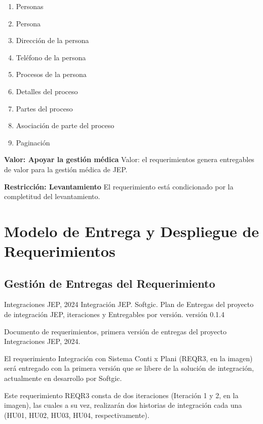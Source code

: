 \documentclass[
  paper=a4,
  ,captions=tableheading
]{scrartcl}
\providecommand{\tightlist}{%
  \setlength{\itemsep}{0pt}\setlength{\parskip}{0pt}}
\renewenvironment{quote}{\begin{customblockquote}\list{}{\rightmargin=0em\leftmargin=0em}%
\item\relax\color{blockquote-text}\ignorespaces}{\unskip\unskip\endlist\end{customblockquote}}
\begin{document}
\begin{enumerate}
\def\labelenumi{\arabic{enumi}.}
\tightlist
\item
  Personas
\item
  Persona
\item
  Dirección de la persona
\item
  Teléfono de la persona
\item
  Procesos de la persona
\item
  Detalles del proceso
\item
  Partes del proceso
\item
  Asociación de parte del proceso
\item
  Paginación
\end{enumerate}

\textbf{Valor: Apoyar la gestión médica} Valor: el requerimientos genera
entregables de valor para la gestión médica de JEP.

\textbf{Restricción: Levantamiento} El requerimiento está condicionado
por la completitud del levantamiento.

\newpage

\section{Modelo de Entrega y Despliegue de
Requerimientos}\label{sec:modelo-de-entrega-y-despliegue-de-requerimientos}

\subsection{Gestión de Entregas del
Requerimiento}\label{sec:gestiuxf3n-de-entregas-del-requerimiento}

\begin{quote}
Integraciones JEP, 2024 Integración JEP. Softgic. Plan de Entregas del
proyecto de integración JEP, iteraciones y Entregables por versión.
versión 0.1.4
\end{quote}

Documento de requerimientos, primera versión de entregas del proyecto
Integraciones JEP, 2024.

El requerimiento Integración con Sistema Conti x Plani (REQR3, en la
imagen) será entregado con la primera versión que se libere de la
solución de integración, actualmente en desarrollo por Softgic.

Este requerimiento REQR3 consta de dos iteraciones (Iteración 1 y 2, en
la imagen), las cuales a su vez, realizarán dos historias de integración
cada una (HU01, HU02, HU03, HU04, respectivamente).
\end{document}
